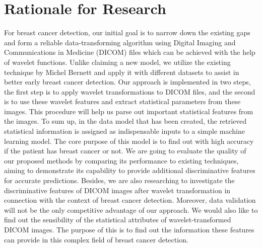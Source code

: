 \section{Rationale for Research}
For breast cancer detection, our initial goal is to narrow down the existing gaps and form a reliable data-transforming algorithm using Digital Imaging and Communications in Medicine (DICOM) files which can be achieved with the help of wavelet functions. Unlike claiming a new model, we utilize the existing technique by Michel Bernett \cite{Michael2006} and apply it with different datasets to assist in better early breast cancer detection.
\newline Our approach is implemented in two steps, the first step is to apply wavelet transformations to DICOM files, and the second is to use these wavelet features and extract statistical parameters from these images. This procedure will help us parse out important statistical features from the images. To sum up, in the data model that has been created, the retrieved statistical information is assigned as indispensable inputs to a simple machine learning model. The core purpose of this model is to find out with high accuracy if the patient has breast cancer or not. 
\newline We are going to evaluate the quality of our proposed methods by comparing its performance to existing techniques, aiming to demonstrate its capability to provide additional discriminative features for accurate predictions. Besides, we are also researching to investigate the discriminative features of DICOM images after wavelet transformation in connection with the context of breast cancer detection. 
\newline Moreover, data validation will not be the only competitive advantage of our approach. We would also like to find out the sensibility of the statistical attributes of wavelet-transformed DICOM images. The purpose of this is to find out the information these features can provide in this complex field of breast cancer detection. 
